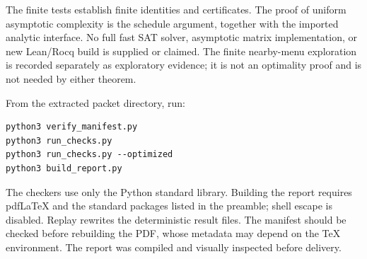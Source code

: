 The finite tests establish finite identities and certificates. The proof
of uniform asymptotic complexity is the schedule argument, together with
the imported analytic interface. No full fast SAT solver, asymptotic
matrix implementation, or new Lean/Rocq build is supplied or claimed.
The finite nearby-menu exploration is recorded separately as exploratory
evidence; it is not an optimality proof and is not needed by either theorem.

\noindent\begin{minipage}{\linewidth}
From the extracted packet directory, run:
\begin{lstlisting}
python3 verify_manifest.py
python3 run_checks.py
python3 run_checks.py --optimized
python3 build_report.py
\end{lstlisting}
\end{minipage}

The checkers use only the Python standard library. Building the report
requires pdfLaTeX and the standard packages listed in the preamble; shell
escape is disabled. Replay rewrites the deterministic result files.
The manifest should be checked before rebuilding the PDF, whose metadata
may depend on the TeX environment. The report was compiled and visually
inspected before delivery.
